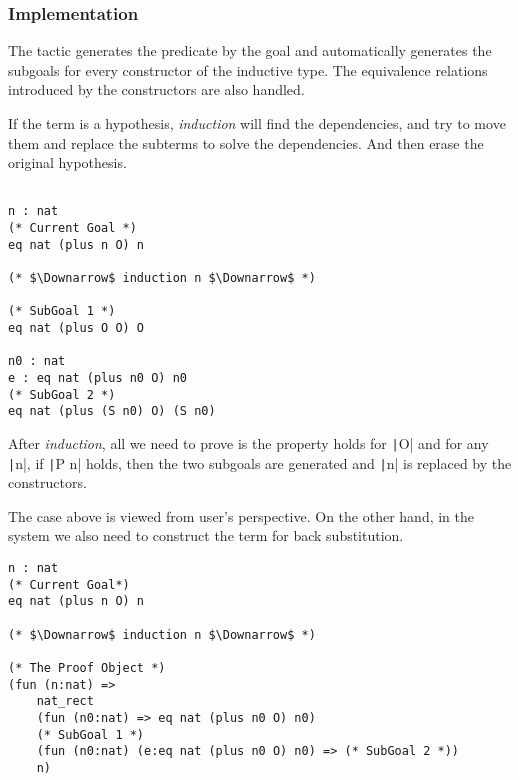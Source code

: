 \subsubsection*{Implementation}

The tactic generates the predicate by the goal and automatically generates 
the subgoals for every constructor of the inductive type.
The equivalence relations introduced by the constructors are also handled.

If the term is a hypothesis, {\it induction} will find the dependencies, 
and try to move them and replace the subterms to solve the dependencies.
And then erase the original hypothesis.

\begin{center}
\begin{minipage}{0.7\textwidth}
\begin{verbatim}
                                                                   
n : nat                                                            
(* Current Goal *)   
eq nat (plus n O) n                       

(* $\Downarrow$ induction n $\Downarrow$ *)

(* SubGoal 1 *)    
eq nat (plus O O) O

n0 : nat                     
e : eq nat (plus n0 O) n0    
(* SubGoal 2 *)              
eq nat (plus (S n0) O) (S n0)
\end{verbatim}
\end{minipage}
\end{center}

After {\it induction}, all we need to prove is the property holds for \texttt|O| and 
for any \texttt|n|, if \texttt|P n| holds,
then the two subgoals are generated and \texttt|n| is replaced by the constructors.

The case above is viewed from user's perspective.
On the other hand, in the system we also need to construct the term for back substitution.
\begin{center}
\begin{minipage}{\textwidth}
\begin{verbatim}
n : nat                               
(* Current Goal*)                              
eq nat (plus n O) n                             

(* $\Downarrow$ induction n $\Downarrow$ *)   

(* The Proof Object *)
(fun (n:nat) =>   
    nat_rect 
    (fun (n0:nat) => eq nat (plus n0 O) n0)
    (* SubGoal 1 *)
    (fun (n0:nat) (e:eq nat (plus n0 O) n0) => (* SubGoal 2 *))
    n)                                                      
\end{verbatim}
\end{minipage}
\end{center}

